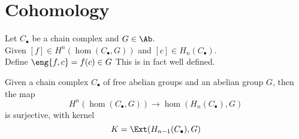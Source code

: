 \documentclass[../main.tex]{subfiles}
\begin{document}
\section{Cohomology}
Let $C_\bullet$ be a chain complex and $G\in \Ab$.\\
Given $[f] \in H^{n}( \hom( C_\bullet,G) ) $ and $[c]\in H_n( C_\bullet) $.\\
Define $\eng{f,c} = f( c) \in G$ 
This is in fact well defined.
\begin{thm}
Given a chain complex $C_\bullet$ of free abelian groups and an abelian group $G$, then the map
\[ 
H^{n }( \hom( C_\bullet,G) ) \to \hom( H_n( C_\bullet) ,G) 
\]
is surjective, with kernel
\[ 
K= \Ext(H_{n-1} ( C_\bullet) ,G ) 
\]


\end{thm}
\end{document}
